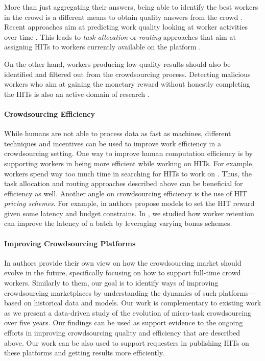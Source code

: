 More than just aggregating their answers,  being able to identify the best workers in the crowd is a different means to obtain quality answers from the crowd \cite{pickacrowd,bozzon}. 
% 
Recent approaches aim at predicting work quality looking at worker activities over time  \cite{Jung14-hcomp}.
% 
This leads to \emph{task allocation} or \emph{routing} approaches that aim at assigning HITs to  workers currently available on the platform \cite{goel2014mechanism,crowdstar}.

On the other hand, workers producing low-quality results should also be identified and filtered out from the crowdsourcing process.
Detecting malicious workers who aim at gaining the monetary reward without honestly  completing the HITs is also an active domain of research \cite{collusion}.






\paragraph{Crowdsourcing Efficiency}
While humans are not able to process data as fast as machines, different techniques and incentives can be used to improve work efficiency in a crowdsourcing setting.
% 
One way to improve human computation efficiency is by supporting workers in being more efficient while working on HITs. For example, workers spend way too much time in searching for HITs to work on \cite{Kucherbaev:2014:TET:2598153.2602249}. Thus, the task allocation and routing approaches described above can be beneficial for efficiency as well.
% 
Another angle on crowdsourcing efficiency is the use of HIT \emph{pricing schemes}. For example, in \cite{finishthem} authors propose models to set the HIT reward given some latency and budget constrains. In \cite{scaleup}, we studied how worker retention can improve the latency of a batch by leveraging varying bonus schemes.

\paragraph{Improving Crowdsourcing Platforms}
In \cite{Kittur:2013:FCW:2441776.2441923} authors provide their own view on how the crowdsourcing market should evolve in the future, specifically focusing on how to  support full-time crowd workers. Similarly to them, our goal is to identify ways of improving crowdsourcing marketplaces by understanding the dynamics of such platforms---based on historical data and models.
Our work is complementary to existing work as we present a data-driven study of the evolution of micro-task crowdsourcing over five years.
Our findings can be used as support evidence to the ongoing efforts in improving crowdsourcing quality and efficiency that are described above.
Our work can be also used to support requesters in publishing HITs on these platforms and getting results more efficiently.




